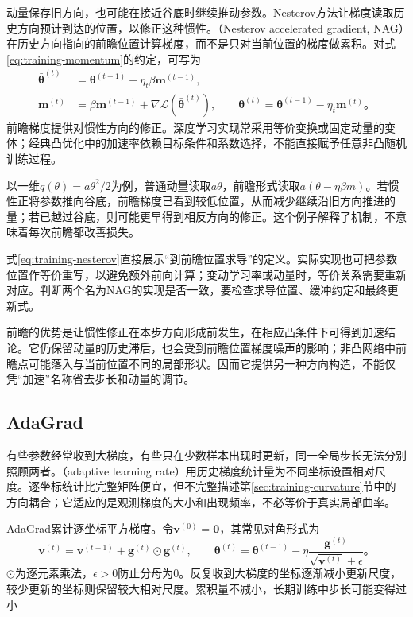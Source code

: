 动量保存旧方向，也可能在接近谷底时继续推动参数。Nesterov方法让梯度读取历史方向预计到达的位置，以修正这种惯性。（Nesterov accelerated gradient, NAG）在历史方向指向的前瞻位置计算梯度，而不是只对当前位置的梯度做累积。对式\eqref{eq:training-momentum}的约定，可写为
\begin{align}
  \bar{\bm\theta}^{(t)}&=\bm\theta^{(t-1)}-\eta_t\beta\bm m^{(t-1)},\\
  \bm m^{(t)}&=\beta\bm m^{(t-1)}+
       \nabla\mathcal L(\bar{\bm\theta}^{(t)}),\qquad
  \bm\theta^{(t)}=\bm\theta^{(t-1)}-\eta_t\bm m^{(t)}\text{。}
  \label{eq:training-nesterov}
\end{align}
前瞻梯度提供对惯性方向的修正。深度学习实现常采用等价变换或固定动量的变体；经典凸优化中的加速率依赖目标条件和系数选择，不能直接赋予任意非凸随机训练过程。

以一维$q(\theta)=a\theta^2/2$为例，普通动量读取$a\theta$，前瞻形式读取$a(\theta-\eta\beta m)$。若惯性正将参数推向谷底，前瞻梯度已看到较低位置，从而减少继续沿旧方向推进的量；若已越过谷底，则可能更早得到相反方向的修正。这个例子解释了机制，不意味着每次前瞻都改善损失。

式\eqref{eq:training-nesterov}直接展示“到前瞻位置求导”的定义。实际实现也可把参数位置作等价重写，以避免额外前向计算；变动学习率或动量时，等价关系需要重新对应。判断两个名为NAG的实现是否一致，要检查求导位置、缓冲约定和最终更新式。

前瞻的优势是让惯性修正在本步方向形成前发生，在相应凸条件下可得到加速结论。它仍保留动量的历史滞后，也会受到前瞻位置梯度噪声的影响；非凸网络中前瞻点可能落入与当前位置不同的局部形状。因而它提供另一种方向构造，不能仅凭“加速”名称省去步长和动量的调节。

\subsection{AdaGrad}
\label{sec:training-adaptive}

有些参数经常收到大梯度，有些只在少数样本出现时更新，同一全局步长无法分别照顾两者。（adaptive learning rate）用历史梯度统计量为不同坐标设置相对尺度。逐坐标统计比完整矩阵便宜，但不完整描述第\ref{sec:training-curvature}节中的方向耦合；它适应的是观测梯度的大小和出现频率，不必等价于真实局部曲率。

AdaGrad累计逐坐标平方梯度。令$\bm v^{(0)}=\bm0$，其常见对角形式为
\begin{equation}
  \bm v^{(t)}=\bm v^{(t-1)}+\bm g^{(t)}\odot\bm g^{(t)},\qquad
  \bm\theta^{(t)}=\bm\theta^{(t-1)}-
  \eta\frac{\bm g^{(t)}}{\sqrt{\bm v^{(t)}}+\epsilon}\text{。}
  \label{eq:training-adagrad}
\end{equation}
$\odot$为逐元素乘法，$\epsilon>0$防止分母为0。反复收到大梯度的坐标逐渐减小更新尺度，较少更新的坐标则保留较大相对尺度。累积量不减小，长期训练中步长可能变得过小

